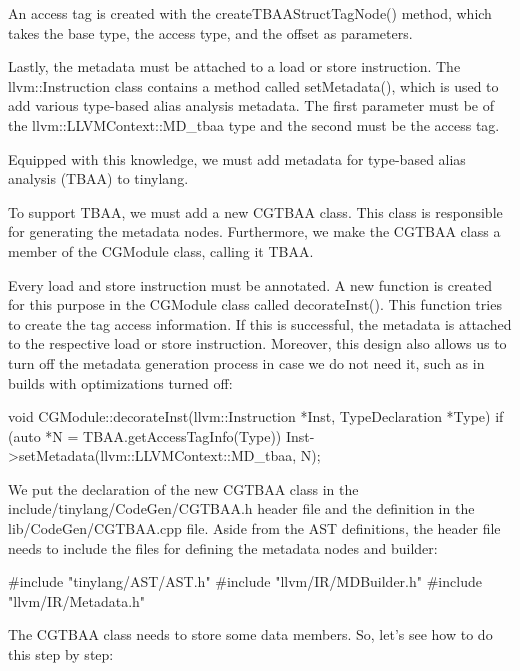 An access tag is created with the createTBAAStructTagNode() method, which takes the base type, the access type, and the offset as parameters.

Lastly, the metadata must be attached to a load or store instruction. The llvm::Instruction class contains a method called setMetadata(), which is used to add various type-based alias analysis metadata. The first parameter must be of the llvm::LLVMContext::MD\_tbaa type and the second must be the access tag.

Equipped with this knowledge, we must add metadata for type-based alias analysis (TBAA) to tinylang.


To support TBAA, we must add a new CGTBAA class. This class is responsible for generating the metadata nodes. Furthermore, we make the CGTBAA class a member of the CGModule class, calling it TBAA.

Every load and store instruction must be annotated. A new function is created for this purpose in the CGModule class called decorateInst(). This function tries to create the tag access information. If this is successful, the metadata is attached to the respective load or store instruction. Moreover, this design also allows us to turn off the metadata generation process in case we do not need it, such as in builds with optimizations turned off:

\begin{cpp}
void CGModule::decorateInst(llvm::Instruction *Inst,
                            TypeDeclaration *Type) {
    if (auto *N = TBAA.getAccessTagInfo(Type))
        Inst->setMetadata(llvm::LLVMContext::MD_tbaa, N);
}
\end{cpp}

We put the declaration of the new CGTBAA class in the include/tinylang/CodeGen/CGTBAA.h header file and the definition in the lib/CodeGen/CGTBAA.cpp file. Aside from the AST definitions, the header file needs to include the files for defining the metadata nodes and builder:

\begin{cpp}
#include "tinylang/AST/AST.h"
#include "llvm/IR/MDBuilder.h"
#include "llvm/IR/Metadata.h"
\end{cpp}

The CGTBAA class needs to store some data members. So, let’s see how to do this step by step:

